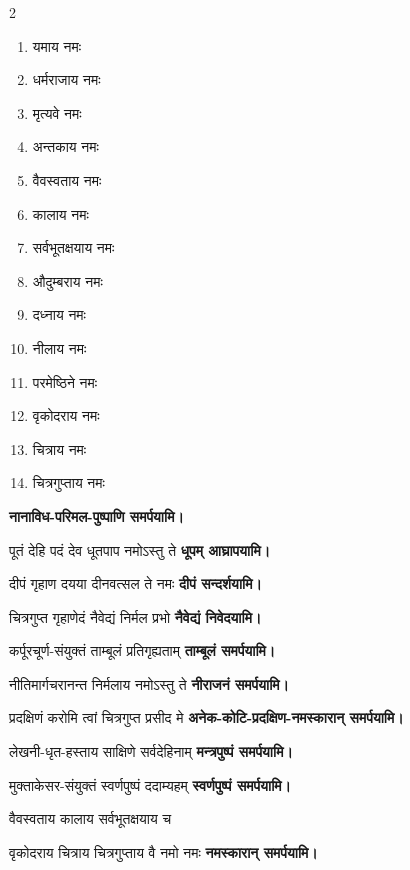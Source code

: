 \begin{multicols}{2}
\begin{enumerate}
\item यमाय नमः
\item धर्मराजाय नमः
\item मृत्यवे नमः
\item अन्तकाय नमः
\item वैवस्वताय नमः
\item कालाय नमः
\item सर्वभूतक्षयाय नमः
\item औदुम्बराय नमः
\item दध्नाय नमः
\item नीलाय नमः
\item परमेष्ठिने नमः
\item वृकोदराय नमः
\item चित्राय नमः
\item चित्रगुप्ताय नमः
\end{enumerate}
\end{multicols}
\begin{center}
\textbf{नानाविध-परिमल-पुष्पाणि समर्पयामि।}
\medskip



{पूतं देहि पदं देव धूतपाप नमोऽस्तु ते}
\textbf{\devAya{} धूपम् आघ्रापयामि।}
\medskip

{दीपं गृहाण दयया दीनवत्सल ते नमः}
\textbf{\devAya{} दीपं सन्दर्शयामि।}
\medskip

{चित्रगुप्त गृहाणेदं नैवेद्यं निर्मल प्रभो}
\textbf{\devAya{} नैवेद्यं निवेदयामि।}
\medskip

{कर्पूरचूर्ण-संयुक्तं ताम्बूलं प्रतिगृह्यताम्}
\textbf{\devAya{} ताम्बूलं समर्पयामि।}
\medskip

{नीतिमार्गचरानन्त निर्मलाय नमोऽस्तु ते}
\textbf{\devAya{} नीराजनं समर्पयामि।}
\medskip

{प्रदक्षिणं करोमि त्वां चित्रगुप्त प्रसीद मे}
\textbf{अनेक-कोटि-प्रदक्षिण-नमस्कारान् समर्पयामि।}
\medskip

{लेखनी-धृत-हस्ताय साक्षिणे सर्वदेहिनाम्}
\textbf{\devAya{} मन्त्रपुष्पं समर्पयामि।}
\medskip

{मुक्ताकेसर-संयुक्तं स्वर्णपुष्पं ददाम्यहम्}
\textbf{\devAya{} स्वर्णपुष्पं समर्पयामि।}
\medskip

{वैवस्वताय कालाय सर्वभूतक्षयाय च}

{वृकोदराय चित्राय चित्रगुप्ताय वै नमो नमः}
\textbf{\devAya{} नमस्कारान् समर्पयामि।}
\medskip

\end{center}


